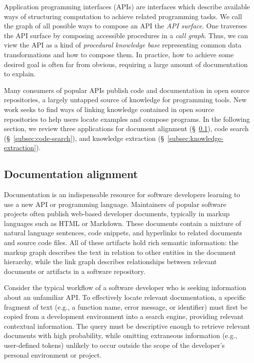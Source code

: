 \documentclass[12pt]{article}
\begin{document}
Application programming interfaces (APIs) are interfaces which describe available ways of structuring computation to achieve related programming tasks. We call the graph of all possible ways to compose an API the \textit{API surface}. One traverses the API surface by composing accessible procedures in a \textit{call graph}. Thus, we can view the API as a kind of \textit{procedural knowledge base} representing common data transformations and how to compose them. In practice, how to achieve some desired goal is often far from obvious, requiring a large amount of documentation to explain.

Many consumers of popular APIs publish code and documentation in open source repositories, a largely untapped source of knowledge for programming tools. New work seeks to find ways of linking knowledge contained in open source repositories to help users locate examples and compose programs. In the following section, we review three applications for document alignment (\S~\ref{subsec:tracelink}), code search (\S~\ref{subsec:code-search}), and knowledge extraction (\S~\ref{subsec:knowledge-extraction}).

\subsection{Documentation alignment}\label{subsec:tracelink}

Documentation is an indispensable resource for software developers learning to use a new API or programming language. Maintainers of popular software projects often publish web-based developer documents, typically in markup languages such as HTML or Markdown. These documents contain a mixture of natural language sentences, code snippets, and hyperlinks to related documents and source code files. All of these artifacts hold rich semantic information: the markup graph describes the text in relation to other entities in the document hierarchy, while the link graph describes relationships between relevant documents or artifacts in a software repository.

Consider the typical workflow of a software developer who is seeking information about an unfamiliar API. To effectively locate relevant documentation, a specific fragment of text (e.g., a function name, error message, or identifier) must first be copied from a development environment into a search engine, providing relevant contextual information. The query must be descriptive enough to retrieve relevant documents with high probability, while omitting extraneous information (e.g., user-defined tokens) unlikely to occur outside the scope of the developer's personal environment or project.
\end{document}
